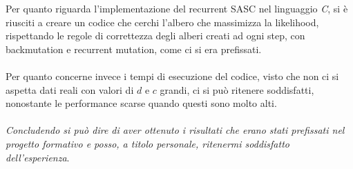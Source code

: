 \documentclass[12pt]{report}
\begin{document}
Per quanto riguarda l'implementazione del recurrent SASC nel linguaggio \textit{C}, si è riusciti a creare un codice che cerchi l'albero che massimizza la likelihood, rispettando le regole di correttezza degli alberi creati ad ogni step, con backmutation e recurrent mutation, come ci si era prefissati.\\\\
Per quanto concerne invece i tempi di esecuzione del codice, visto che non ci si aspetta dati reali con valori di $d$ e $c$ grandi, ci si può ritenere soddisfatti, nonostante le performance scarse quando questi sono molto alti.\\\\
\textit{Concludendo si può dire di aver ottenuto i risultati che erano stati prefissati nel progetto formativo e posso, a titolo personale, ritenermi soddisfatto dell’esperienza}.

\singlespacing
\newpage
{}
{}
\printbibliography[title={Bibliografia e sitografia}]
\end{document}
